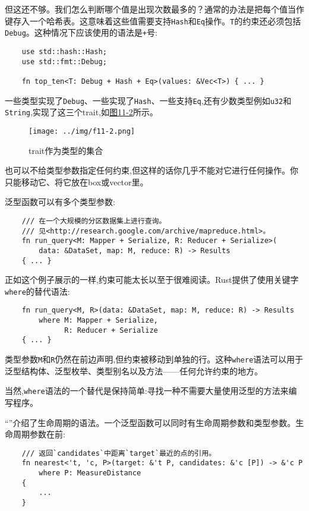 但这还不够。我们怎么判断哪个值是出现次数最多的？通常的办法是把每个值当作键存入一个哈希表。这意味着这些值需要支持\texttt{Hash}和\texttt{Eq}操作。\texttt{T}的约束还必须包括\texttt{Debug}。这种情况下应该使用的语法是\texttt{+}号:
\begin{verbatim}
    use std::hash::Hash;
    use std::fmt::Debug;

    fn top_ten<T: Debug + Hash + Eq>(values: &Vec<T>) { ... }
\end{verbatim}

一些类型实现了\texttt{Debug}、一些实现了\texttt{Hash}、一些支持\texttt{Eq},还有少数类型例如\texttt{u32}和\texttt{String},实现了这三个trait,如\hyperref[f11-2]{图11-2}所示。

\begin{figure}[htbp]
    \centering
    \texttt{[image: ../img/f11-2.png]}
    \caption{trait作为类型的集合}
    \label{f11-2}
\end{figure}

也可以不给类型参数指定任何约束,但这样的话你几乎不能对它进行任何操作。你只能移动它、将它放在box或vector里。

泛型函数可以有多个类型参数:
\begin{verbatim}
    /// 在一个大规模的分区数据集上进行查询。
    /// 见<http://research.google.com/archive/mapreduce.html>。
    fn run_query<M: Mapper + Serialize, R: Reducer + Serialize>(
        data: &DataSet, map: M, reduce: R) -> Results
    { ... }
\end{verbatim}

正如这个例子展示的一样,约束可能太长以至于很难阅读。Rust提供了使用关键字\texttt{where}的替代语法:
\begin{verbatim}
    fn run_query<M, R>(data: &DataSet, map: M, reduce: R) -> Results
        where M: Mapper + Serialize,
              R: Reducer + Serialize
    { ... }
\end{verbatim}

类型参数\texttt{M}和\texttt{R}仍然在前边声明,但约束被移动到单独的行。这种\texttt{where}语法可以用于泛型结构体、泛型枚举、类型别名以及方法——任何允许约束的地方。

当然,\texttt{where}语法的一个替代是保持简单:寻找一种不需要大量使用泛型的方法来编写程序。

“”介绍了生命周期的语法。一个泛型函数可以同时有生命周期参数和类型参数。生命周期参数在前:
\begin{verbatim}
    /// 返回`candidates`中距离`target`最近的点的引用。
    fn nearest<'t, 'c, P>(target: &'t P, candidates: &'c [P]) -> &'c P
        where P: MeasureDistance
    {
        ...
    }
\end{verbatim}

